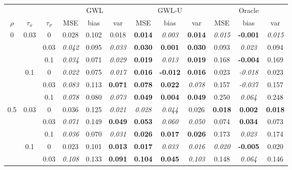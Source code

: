 \documentclass[authoryear, review, 11pt]{elsarticle}
\begin{document}
		
		\begin{table}[ht]
		\begin{center}
		\begin{tabular}{ccc | ccc | ccc | ccc }
		&&&\multicolumn{3}{c}{GWL}&\multicolumn{3}{c}{GWL-U}&\multicolumn{3}{c}{Oracle}\\
		$\rho$ & $\tau_x$ & $\tau_\sigma$ & MSE & bias & var &  MSE & bias & var &  MSE & bias & var\\   \hline
		\multirow{6}{*}{0} & \multirow{3}{*}{0.03} & 0 & 0.028 & 0.102 & 0.018 & \textbf{0.014} & \emph{0.003} & \textbf{0.014} & \emph{0.015} & \textbf{-0.001} & \emph{0.015} \\ 
		 &  & 0.03 &   \emph{0.042} & 0.095 & \emph{0.033} & \textbf{0.030} & \textbf{0.001} & \textbf{0.030} & 0.093 & \emph{0.023} & 0.094 \\ 
		 &  & 0.1 &   \emph{0.034} & 0.071 & \emph{0.029} & \textbf{0.019} & \emph{0.013} & \textbf{0.019} & 0.168 & \textbf{-0.004} & 0.169 \\ \cline{2-12}
		 & \multirow{3}{*}{0.1} & 0 &   \emph{0.022} & 0.075 & \emph{0.017} & \textbf{0.016} & \textbf{-0.012} & \textbf{0.016} & 0.023 & \emph{-0.018} & 0.023 \\ 
		 &  & 0.03 &   \emph{0.083} & 0.113 & \textbf{0.071} & \textbf{0.078} & \textbf{0.022} & \emph{0.078} & 0.157 & \emph{-0.037} & 0.157 \\ 
		 &  & 0.1 &   \emph{0.078} & 0.080 & \emph{0.073} & \textbf{0.049} & \textbf{0.004} & \textbf{0.049} & 0.250 & \emph{0.064} & 0.248 \\ \cline{1-12}
		\multirow{6}{*}{0.5} & \multirow{3}{*}{0.03} & 0 &   0.036 & 0.125 & \emph{0.021} & \emph{0.028} & \emph{0.044} & 0.026 & \textbf{0.018} & \textbf{0.002} & \textbf{0.018} \\ 
		 &  & 0.03 &   \emph{0.071} & 0.149 & \textbf{0.049} & \textbf{0.053} & \emph{0.060} & \emph{0.050} & 0.074 & \textbf{0.034} & 0.073 \\ 
		 &  & 0.1 &   \emph{0.036} & 0.070 & \emph{0.031} & \textbf{0.026} & \textbf{0.017} & \textbf{0.026} & 0.173 & \emph{0.023} & 0.174 \\ \cline{2-12}
		 & \multirow{3}{*}{0.1} & 0 &   0.023 & 0.101 & \textbf{0.013} & \textbf{0.017} & \emph{0.033} & \emph{0.016} & \emph{0.020} & \textbf{-0.005} & 0.020 \\ 
		 &  & 0.03 &   \emph{0.108} & 0.133 & \textbf{0.091} & \textbf{0.104} & \textbf{0.045} & \emph{0.103} & 0.148 & \emph{0.064} & 0.146 \\ 

\end{tabular}
\end{center}
\end{table}
\end{document}
